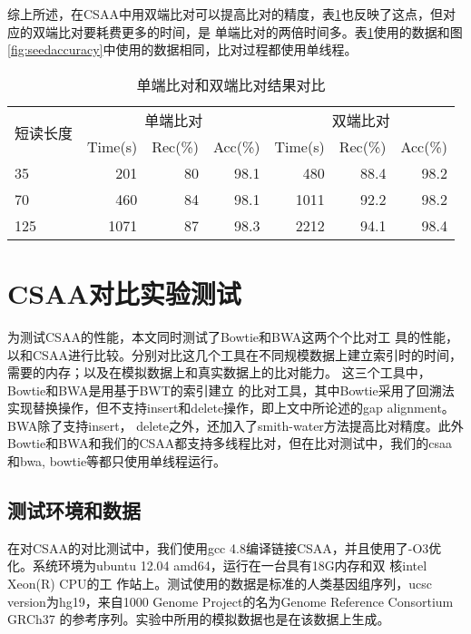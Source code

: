 综上所述，在CSAA中用双端比对可以提高比对的精度，表\ref{tab:alignmentaccuracy}也反映了这点，但对应的双端比对要耗费更多的时间，是
单端比对的两倍时间多。表\ref{tab:alignmentaccuracy}使用的数据和图\ref{fig:seedaccuracy}中使用的数据相同，比对过程都使用单线程。

\begin{table}[htbp]
    \caption{单端比对和双端比对结果对比}
    \label{tab:alignmentaccuracy}
    \centering
    \begin{tabular}{lrrrrrr}
        \toprule
        \multirow{2}{*}{短读长度} & \multicolumn{3}{c}{单端比对} & \multicolumn{3}{c}{双端比对}\\
        \cline{2-4}
        \cline{5-7}
        &Time(s) &Rec(\%) &Acc(\%) &Time(s) &Rec(\%) &Acc(\%)\\
        \midrule
        35 &201 &80 &98.1 &480 &88.4 &98.2 \\
        70 &460 &84 &98.1 &1011 &92.2 &98.2 \\
        125 &1071 &87 &98.3 &2212 &94.1 &98.4 \\
        \bottomrule
    \end{tabular}
\end{table}



\section{CSAA对比实验测试}

为测试CSAA的性能，本文同时测试了Bowtie\cite{langmead2009ultrafast}和BWA\cite{li2009fast}这两个个比对工
具的性能，以和CSAA进行比较。分别对比这几个工具在不同规模数据上建立索引时的时间，需要的内存；以及在模拟数据上和真实数据上的比对能力。
这三个工具中，Bowtie和BWA是用基于BWT的索引建立
的比对工具，其中Bowtie采用了回溯法实现替换操作，但不支持insert和delete操作，即上文中所论述的gap alignment。BWA除了支持insert，
delete之外，还加入了smith-water方法提高比对精度。此外Bowtie和BWA和我们的CSAA都支持多线程比对，但在比对测试中，我们的csaa和bwa,
bowtie等都只使用单线程运行。

\subsection{测试环境和数据}

在对CSAA的对比测试中，我们使用gcc 4.8编译链接CSAA，并且使用了-O3优化。系统环境为ubuntu 12.04 amd64，运行在一台具有18G内存和双
核intel Xeon(R) CPU的工
作站上。测试使用的数据是标准的人类基因组序列，ucsc version为hg19，来自1000 Genome Project的名为Genome Reference Consortium GRCh37
的参考序列。实验中所用的模拟数据也是在该数据上生成。

